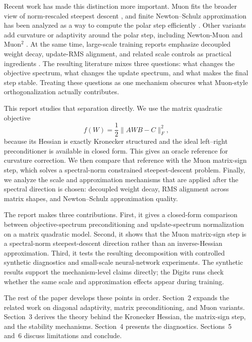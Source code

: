 \documentclass[sigconf,nonacm]{acmart}
\begin{document}
Recent work has made this distinction more important. Muon fits the broader view of norm-rescaled steepest descent \citep{bernstein2024oldoptimizer}, and finite Newton--Schulz approximation has been analyzed as a way to compute the polar step efficiently \citep{kim2026convergence}. Other variants add curvature or adaptivity around the polar step, including Newton-Muon and Muon$^2$ \citep{du2026newtonmuon,liu2026muon2}. At the same time, large-scale training reports emphasize decoupled weight decay, update-RMS alignment, and related scale controls as practical ingredients \citep{liu2025moonlight,su2025muonchoice,su2025qkclip}. The resulting literature mixes three questions: what changes the objective spectrum, what changes the update spectrum, and what makes the final step stable. Treating these questions as one mechanism obscures what Muon-style orthogonalization actually contributes.

This report studies that separation directly. We use the matrix quadratic objective
\begin{equation}
  f(W)=\frac{1}{2}\|AWB-C\|_F^2,
\end{equation}
because its Hessian is exactly Kronecker structured and the ideal left--right preconditioner is available in closed form. This gives an oracle reference for curvature correction. We then compare that reference with the Muon matrix-sign step, which solves a spectral-norm constrained steepest-descent problem. Finally, we analyze the scale and approximation mechanisms that are applied after the spectral direction is chosen: decoupled weight decay, RMS alignment across matrix shapes, and Newton--Schulz approximation quality.

The report makes three contributions. First, it gives a closed-form comparison between objective-spectrum preconditioning and update-spectrum normalization on a matrix quadratic model. Second, it shows that the Muon matrix-sign step is a spectral-norm steepest-descent direction rather than an inverse-Hessian approximation. Third, it tests the resulting decomposition with controlled synthetic diagnostics and small-scale neural-network experiments. The synthetic results support the mechanism-level claims directly; the Digits runs check whether the same scale and approximation effects appear during training.

The rest of the paper develops these points in order. Section~2 expands the related work on diagonal adaptivity, matrix preconditioning, and Muon variants. Section~3 derives the theory behind the Kronecker Hessian, the matrix-sign step, and the stability mechanisms. Section~4 presents the diagnostics. Sections~5 and~6 discuss limitations and conclude.
\end{document}
